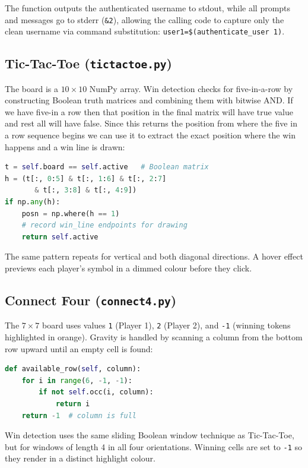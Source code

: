 \documentclass[12pt,a4paper]{article}
\begin{document}
The function outputs the authenticated username to stdout, while all prompts and messages go
to stderr (\texttt{\&2}), allowing the calling code to capture only the clean username via
command substitution: \texttt{user1=\$(authenticate\_user 1)}.

\subsection{Tic-Tac-Toe (\texttt{tictactoe.py})}

The board is a $10{\times}10$ NumPy array. Win detection checks for five-in-a-row by
constructing Boolean truth matrices and combining them with bitwise AND. If we have five-in a row then that position in the final matrix will have true value and rest all will have false. Since this returns the position from where the five in a row sequence begins we can use it to extract the exact position where the win happens and a win line is drawn:

\begin{lstlisting}[language=Python, caption={Vectorised horizontal win check}]
t = self.board == self.active   # Boolean matrix
h = (t[:, 0:5] & t[:, 1:6] & t[:, 2:7]
       & t[:, 3:8] & t[:, 4:9])
if np.any(h):
    posn = np.where(h == 1)
    # record win_line endpoints for drawing
    return self.active
\end{lstlisting}

The same pattern repeats for vertical and both diagonal directions. A hover effect previews
each player's symbol in a dimmed colour before they click.

\subsection{Connect Four (\texttt{connect4.py})}

The $7{\times}7$ board uses values \texttt{1} (Player 1), \texttt{2} (Player 2), and
\texttt{-1} (winning tokens highlighted in orange). Gravity is handled by scanning a column
from the bottom row upward until an empty cell is found:

\begin{lstlisting}[language=Python, caption={Gravity: finding the lowest empty row}]
def available_row(self, column):
    for i in range(6, -1, -1):
        if not self.occ(i, column):
            return i
    return -1  # column is full
\end{lstlisting}

Win detection uses the same sliding Boolean window technique as Tic-Tac-Toe, but for windows
of length 4 in all four orientations. Winning cells are set to \texttt{-1} so they render
in a distinct highlight colour.
\end{document}
